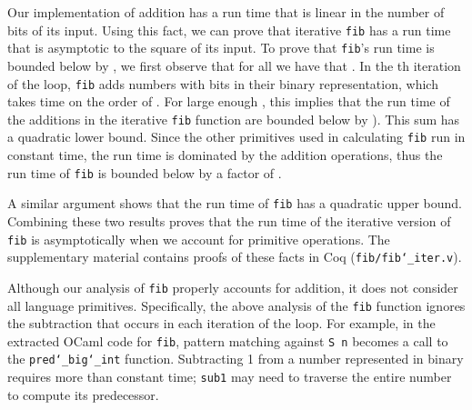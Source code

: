 \documentclass{llncs}
\newcommand{\Scribtexttt}[1]{{\texttt{#1}}}
\begin{document}
Our implementation of addition has a run time that is linear in the
number of bits of its input. Using this fact, we can prove
that iterative \Scribtexttt{fib} has a run time that is asymptotic to the square of its input.
To prove that \Scribtexttt{fib}{'}s run time is bounded below by , we first observe that for all
 we have that .
In the th iteration of the loop, \Scribtexttt{fib} adds numbers with
 bits in their binary representation, which
takes time on the order of .
For large enough , this implies that the run time of the
additions in the iterative \Scribtexttt{fib} function are bounded below by
). This sum has a quadratic lower bound.
Since the other primitives used in calculating \Scribtexttt{fib}
run in constant time, the run time is dominated by the addition operations,
thus the run time of \Scribtexttt{fib} is bounded below by a factor of .

A similar argument shows that the run time of \Scribtexttt{fib} has a quadratic upper bound.
Combining these two results proves that the run time of the iterative version of \Scribtexttt{fib}
is asymptotically  when we account for primitive operations.
The supplementary material contains proofs of these facts in Coq (\Scribtexttt{fib/fib{\char`\_}iter{\hbox{\texttt{.}}}v}).

Although our analysis of \Scribtexttt{fib} properly accounts for addition, it
does not consider all language primitives. Specifically, the above analysis
of the \Scribtexttt{fib} function ignores the subtraction that occurs
in each iteration of the loop. For example, in the extracted OCaml code  for
\Scribtexttt{fib}, pattern matching against \Scribtexttt{S n} becomes a call to
the \Scribtexttt{pred{\char`\_}big{\char`\_}int} function. Subtracting 1 from a number represented in binary
requires more than constant time; \Scribtexttt{sub1} may need to traverse the entire
number to compute its predecessor.
\end{document}
